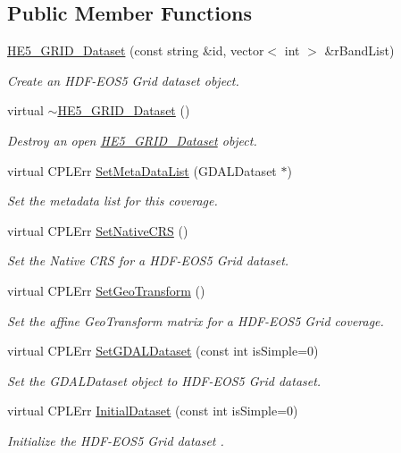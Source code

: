 \subsection*{Public Member Functions}
\begin{DoxyCompactItemize}
\item 
\hyperlink{classHE5__GRID__Dataset_ac0112c68e36c333ecd5674ed09949eee}{HE5\_\-GRID\_\-Dataset} (const string \&id, vector$<$ int $>$ \&rBandList)
\begin{DoxyCompactList}\small\item\em Create an HDF-\/EOS5 Grid dataset object. \end{DoxyCompactList}\item 
virtual \hyperlink{classHE5__GRID__Dataset_a53a2be006884df9ba95a58d9db1aa0fc}{$\sim$HE5\_\-GRID\_\-Dataset} ()
\begin{DoxyCompactList}\small\item\em Destroy an open \hyperlink{classHE5__GRID__Dataset}{HE5\_\-GRID\_\-Dataset} object. \end{DoxyCompactList}\item 
virtual CPLErr \hyperlink{classHE5__GRID__Dataset_aab2d7ffe28f4b1fda41f5ec10a33e8a3}{SetMetaDataList} (GDALDataset $\ast$)
\begin{DoxyCompactList}\small\item\em Set the metadata list for this coverage. \end{DoxyCompactList}\item 
virtual CPLErr \hyperlink{classHE5__GRID__Dataset_a2bdcf5b88ef679f6fcfd7cd909e56bb7}{SetNativeCRS} ()
\begin{DoxyCompactList}\small\item\em Set the Native CRS for a HDF-\/EOS5 Grid dataset. \end{DoxyCompactList}\item 
virtual CPLErr \hyperlink{classHE5__GRID__Dataset_ab20ae6fe7456bb91c0cd8b4fdb6db1f1}{SetGeoTransform} ()
\begin{DoxyCompactList}\small\item\em Set the affine GeoTransform matrix for a HDF-\/EOS5 Grid coverage. \end{DoxyCompactList}\item 
virtual CPLErr \hyperlink{classHE5__GRID__Dataset_afc38747b72c0862de45f897867903e57}{SetGDALDataset} (const int isSimple=0)
\begin{DoxyCompactList}\small\item\em Set the GDALDataset object to HDF-\/EOS5 Grid dataset. \end{DoxyCompactList}\item 
virtual CPLErr \hyperlink{classHE5__GRID__Dataset_ac6cc1fb1d47bd7fa387fa7e5673d0c6a}{InitialDataset} (const int isSimple=0)
\begin{DoxyCompactList}\small\item\em Initialize the HDF-\/EOS5 Grid dataset . \end{DoxyCompactList}\end{DoxyCompactItemize}
